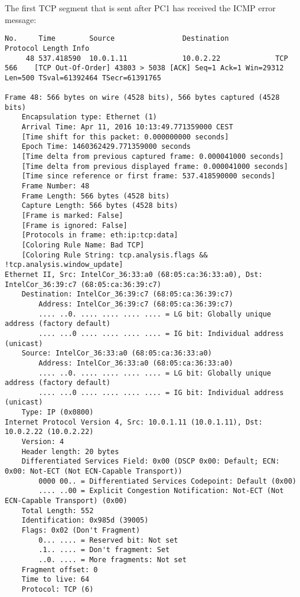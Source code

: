 The first TCP segment that is sent after PC1 has received the ICMP error message:

\begin{lstlisting}
No.     Time        Source                Destination           Protocol Length Info
     48 537.418590  10.0.1.11             10.0.2.22             TCP      566    [TCP Out-Of-Order] 43803 > 5038 [ACK] Seq=1 Ack=1 Win=29312 Len=500 TSval=61392464 TSecr=61391765

Frame 48: 566 bytes on wire (4528 bits), 566 bytes captured (4528 bits)
    Encapsulation type: Ethernet (1)
    Arrival Time: Apr 11, 2016 10:13:49.771359000 CEST
    [Time shift for this packet: 0.000000000 seconds]
    Epoch Time: 1460362429.771359000 seconds
    [Time delta from previous captured frame: 0.000041000 seconds]
    [Time delta from previous displayed frame: 0.000041000 seconds]
    [Time since reference or first frame: 537.418590000 seconds]
    Frame Number: 48
    Frame Length: 566 bytes (4528 bits)
    Capture Length: 566 bytes (4528 bits)
    [Frame is marked: False]
    [Frame is ignored: False]
    [Protocols in frame: eth:ip:tcp:data]
    [Coloring Rule Name: Bad TCP]
    [Coloring Rule String: tcp.analysis.flags && !tcp.analysis.window_update]
Ethernet II, Src: IntelCor_36:33:a0 (68:05:ca:36:33:a0), Dst: IntelCor_36:39:c7 (68:05:ca:36:39:c7)
    Destination: IntelCor_36:39:c7 (68:05:ca:36:39:c7)
        Address: IntelCor_36:39:c7 (68:05:ca:36:39:c7)
        .... ..0. .... .... .... .... = LG bit: Globally unique address (factory default)
        .... ...0 .... .... .... .... = IG bit: Individual address (unicast)
    Source: IntelCor_36:33:a0 (68:05:ca:36:33:a0)
        Address: IntelCor_36:33:a0 (68:05:ca:36:33:a0)
        .... ..0. .... .... .... .... = LG bit: Globally unique address (factory default)
        .... ...0 .... .... .... .... = IG bit: Individual address (unicast)
    Type: IP (0x0800)
Internet Protocol Version 4, Src: 10.0.1.11 (10.0.1.11), Dst: 10.0.2.22 (10.0.2.22)
    Version: 4
    Header length: 20 bytes
    Differentiated Services Field: 0x00 (DSCP 0x00: Default; ECN: 0x00: Not-ECT (Not ECN-Capable Transport))
        0000 00.. = Differentiated Services Codepoint: Default (0x00)
        .... ..00 = Explicit Congestion Notification: Not-ECT (Not ECN-Capable Transport) (0x00)
    Total Length: 552
    Identification: 0x985d (39005)
    Flags: 0x02 (Don't Fragment)
        0... .... = Reserved bit: Not set
        .1.. .... = Don't fragment: Set
        ..0. .... = More fragments: Not set
    Fragment offset: 0
    Time to live: 64
    Protocol: TCP (6)

\end{lstlisting}
